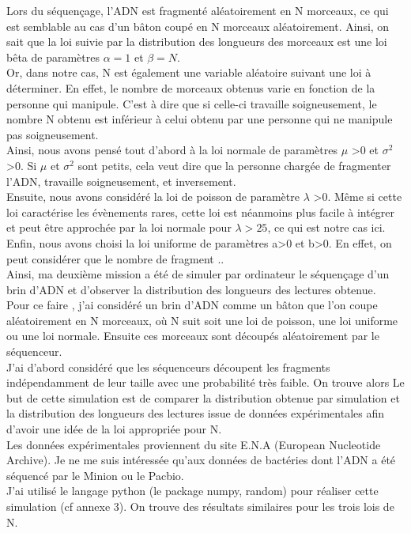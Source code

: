 \documentclass[11pt,a4paper]{article} %
\begin{document}
Lors du séquençage, l'ADN est fragmenté aléatoirement en N morceaux, ce qui est semblable au cas d'un bâton coupé en N morceaux aléatoirement. Ainsi, on sait que la loi suivie par la distribution des longueurs des morceaux est une loi bêta de paramètres $\alpha=1$ et $\beta = N$. \\
Or, dans notre cas, N est également une variable aléatoire suivant une loi à déterminer.
En effet, le nombre de morceaux obtenus varie en fonction de la personne qui manipule. C'est à dire que si celle-ci travaille soigneusement, le nombre N obtenu est inférieur à celui obtenu par une personne qui ne manipule pas soigneusement. \\
Ainsi, nous avons pensé tout d'abord à la loi normale de paramètres $\mu$ >0 et $\sigma^2$ >0. Si $\mu$ et $\sigma^2$ sont petits, cela veut dire que la personne chargée de fragmenter l'ADN, travaille soigneusement, et inversement. \\
Ensuite, nous avons considéré la loi de poisson de paramètre $\lambda$ >0. Même si cette loi caractérise les évènements rares, cette loi est néanmoins plus facile à intégrer et peut être approchée par la loi normale pour $\lambda>25$, ce qui est notre cas ici. \\
Enfin, nous avons choisi la loi uniforme de paramètres a>0 et b>0. En effet, on peut considérer que le nombre de fragment ..  \\
Ainsi, ma deuxième mission a été de simuler par ordinateur le séquençage d'un brin d'ADN et d'observer la distribution des longueurs des lectures obtenue.\\
Pour ce faire , j'ai considéré un brin d'ADN comme un bâton que l'on coupe aléatoirement en N morceaux, où N suit soit une loi de poisson, une loi uniforme ou une loi normale. Ensuite ces morceaux sont découpés aléatoirement par le séquenceur.\\
J'ai d'abord considéré que les séquenceurs découpent les fragments indépendamment de leur taille avec une probabilité très faible. On trouve alors 
Le but de cette simulation est de comparer la distribution obtenue par simulation et la distribution des longueurs des lectures issue de données expérimentales afin d'avoir une idée de la loi appropriée pour N.\\
Les données expérimentales proviennent du site E.N.A (European Nucleotide Archive). Je ne me suis intéressée qu'aux données de bactéries dont l'ADN a été séquencé par le Minion ou le Pacbio. \\
J'ai utilisé le langage python (le package numpy, random) pour réaliser cette simulation (cf annexe 3). On trouve des résultats similaires pour les trois lois de N. \\
\end{document}
